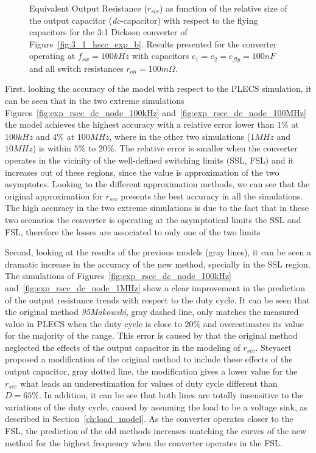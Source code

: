 \begin{figure}[!h]
\newcommand\pHeigh{5cm}
\newcommand\pWidth{7cm}
\centering
     
     \caption{Equivalent Output Resistance ($r_{scc}$) as function of the relative size of the output capacitor (\emph{dc}-capacitor) with respect to the flying capacitors for the 3:1 Dickson converter of Figure~\ref{fig:3_1_hscc_exp_b}. Results presented for the converter operating at $f_{sw}=100kHz$ with capacitors $c_1=c_2=c_{fly}=100nF$ and all switch resistances $r_{on} = 100m\Omega$.}\label{fig:exp_rscc_pwm_node_fsw}
\end{figure}

First, looking the accuracy of the model with respect to the PLECS simulation, it can be seen that in the two extreme simulations Figures~\ref{fig:exp_rscc_dc_node_100kHz} and~\ref{fig:exp_rscc_dc_node_100MHz} the model achieves the highest accuracy with a relative error lower than $1\%$ at $100kHz$ and $4\%$ at $100MHz$, where in the other two simulations ($1MHz$ and $10MHz$) is within $5\%$ to $20\%$. The relative error is smaller when the converter operates in the vicinity of the well-defined switching limits (SSL, FSL) and it increases out of these regions, since the value is approximation of the two asymptotes. Looking to the different approximation methods, we can see that the original approximation for $r_{scc}$ presents the best accuracy in all the simulations. The high accuracy in the two extreme simulations is due to the fact that in these two scenarios the converter is operating at the asymptotical limits the SSL and FSL, therefore the losses are associated to only one of the two limits

Second, looking at the results of the previous models (gray lines), it can be seen a dramatic increase in the accuracy of the new method, specially in the SSL region. The simulations of Figures~\ref{fig:exp_rscc_dc_node_100kHz} and~\ref{fig:exp_rscc_dc_node_1MHz} show a clear improvement in the prediction of the output resistance trends with respect to the duty cycle. It can be seen that the original method  \emph{95Makowski}, gray dashed line, only matches the measured value in PLECS when the duty cycle is close to $20\%$ and overestimates its value for the majority of the range.  This error is caused by that the original method neglected the effects of the output capacitor in the modeling of $r_{scc}$. Steyaert proposed a modification of the original method to include these effects of the output capacitor, gray dotted line, the modification gives a lower value for the $r_{scc}$ what leads an underestimation for values of duty cycle different than $D=65\%$. In addition, it can be see that both lines are totally insensitive to the variations of the duty cycle, caused by assuming the load to be a voltage sink, as described in Section~\ref{ch:load_model}. As the converter operates closer to the FSL, the prediction of the old methods increases matching the curves of the new method for the highest frequency when the converter operates in the FSL.

